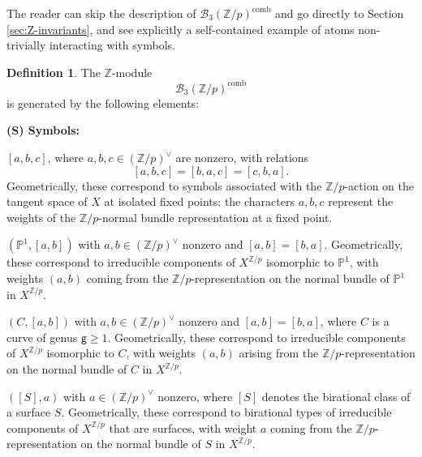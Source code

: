 \documentclass[12pt,a4paper]{amsart}
\theoremstyle{definition}
\newtheorem{definition}[theorem]{Definition}
\theoremstyle{remark}
\begin{document}
The reader can skip the description of  \(\mathcal{B}_3(\mathbb{Z}/p)^{\mathrm{comb}}\) and go directly to Section \ref{sec:Z-invariants}, and see explicitly a self-contained example of atoms non-trivially interacting with symbols.

\begin{definition} \label{def:atoms-meet-symbols}
The $\mathbb{Z}$-module 
\[
\mathcal{B}_3(\mathbb{Z}/p)^{\mathrm{comb}}
\]
is generated by the following elements:

\noindent\textbf{(S) Symbols:}
\begin{defenum}
    \item \label{item:S1} $[a,b,c]$, where $a,b,c \in (\mathbb{Z}/p)^{\vee}$ are nonzero, with relations 
    \[
    [a,b,c] = [b,a,c] = [c,b,a].
    \]
    Geometrically, these correspond to symbols associated with the $\mathbb{Z}/p$-action on the tangent space of $X$ at isolated fixed points: the characters $a,b,c$ represent the weights of the $\mathbb{Z}/p$-normal bundle representation at a fixed point.

    \item $(\mathbb{P}^1,[a,b])$ with $a,b \in (\mathbb{Z}/p)^{\vee}$ nonzero and $[a,b]=[b,a]$.  
    Geometrically, these correspond to irreducible components of $X^{\mathbb{Z}/p}$ isomorphic to $\mathbb{P}^1$, with weights $(a,b)$ coming from the $\mathbb{Z}/p$-representation on the normal bundle of $\mathbb{P}^1$ in $X^{\mathbb{Z}/p}$.

    \item $(C,[a,b])$ with $a,b \in (\mathbb{Z}/p)^{\vee}$ nonzero and $[a,b]=[b,a]$, where $C$ is a curve of genus $\mathsf{g} \geq 1$.  
    Geometrically, these correspond to irreducible components of $X^{\mathbb{Z}/p}$ isomorphic to $C$, with weights $(a,b)$ arising from the $\mathbb{Z}/p$-representation on the normal bundle of $C$ in $X^{\mathbb{Z}/p}$.

    \item $([S],a)$ with $a \in (\mathbb{Z}/p)^{\vee}$ nonzero, where $[S]$ denotes the birational class of a surface $S$.  
    Geometrically, these correspond to birational types of irreducible components of $X^{\mathbb{Z}/p}$ that are surfaces, with weight $a$ coming from the $\mathbb{Z}/p$-representation on the normal bundle of $S$ in $X^{\mathbb{Z}/p}$.
\end{defenum}


\end{definition}
\end{document}
